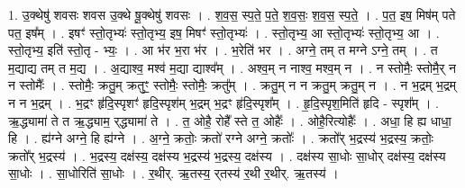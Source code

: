\documentclass[17pt]{extarticle}
\begin{document}
1. उ॒क्थेषु॑ शवसः शवस उ॒क्थे षू॒क्थेषु॑ शवसः । . श॒व॒स॒ स्प॒ते॒ प॒ते॒ श॒व॒सः॒ श॒व॒स॒ स्प॒ते॒ । . प॒त॒ इष॒ मिष॑म् पते पत॒ इष᳚म् । . इषꣳ॑ स्तो॒तृभ्यः॑ स्तो॒तृभ्य॒ इष॒ मिषꣳ॑ स्तो॒तृभ्यः॑ । . स्तो॒तृभ्य॒ आ स्तो॒तृभ्यः॑ स्तो॒तृभ्य॒ आ । . स्तो॒तृभ्य॒ इति॑ स्तो॒तृ - भ्यः॒ । . आ भ॑र भ॒रा भ॑र । . भ॒रेति॑ भर । . अग्ने॒ तम् त मग्ने ऽग्ने॒ तम् । . त म॒द्याद्य तम् त म॒द्य । . अ॒द्याश्व॒ मश्व॑ म॒द्या द्याश्व᳚म् । . अश्व॒म् न नाश्व॒ मश्व॒म् न । . न स्तोमैः॒ स्तोमै॒र् न न स्तोमैः᳚ । . स्तोमैः॒ क्रतु॒म् क्रतुꣳ॒॒ स्तोमैः॒ स्तोमैः॒ क्रतु᳚म् । . क्रतु॒म् न न क्रतु॒म् क्रतु॒म् न । . न भ॒द्रम् भ॒द्रम् न न भ॒द्रम् । . भ॒द्रꣳ हृ॑दि॒स्पृशꣳ॑ हृदि॒स्पृश॑म् भ॒द्रम् भ॒द्रꣳ हृ॑दि॒स्पृश᳚म् । . हृ॒दि॒स्पृश॒मिति॑ हृदि - स्पृश᳚म् । . ऋ॒द्ध्यामा॑ ते त ऋ॒द्ध्याम॒ र्‌द्ध्यामा॑ ते । . त॒ ओहै॒ रोहै᳚ स्ते त॒ ओहैः᳚ । . ओहै॒रित्योहैः᳚ । . अधा॒ हि ह्य धाधा॒ हि । . ह्य॑ग्ने अग्ने॒ हि ह्य॑ग्ने । . अ॒ग्ने॒ क्रतोः॒ क्रतो॑ रग्ने अग्ने॒ क्रतोः᳚ । . क्रतो᳚र् भ॒द्रस्य॑ भ॒द्रस्य॒ क्रतोः॒ क्रतो᳚र् भ॒द्रस्य॑ । . भ॒द्रस्य॒ दक्ष॑स्य॒ दक्ष॑स्य भ॒द्रस्य॑ भ॒द्रस्य॒ दक्ष॑स्य । . दक्ष॑स्य सा॒धोः सा॒धोर् दक्ष॑स्य॒ दक्ष॑स्य सा॒धोः । . सा॒धोरिति॑ सा॒धोः । . र॒थीर्. ऋ॒तस्य॒ र्‌तस्य॑ र॒थी र॒थीर्. ऋ॒तस्य॑ । \newline
\end{document}
